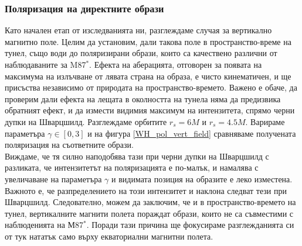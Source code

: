 \subsubsection{Поляризация на директните образи}
Като начален етап от изследванията ни, разглеждаме случая за вертикално магнитно поле. Целим да установим, дали такова поле в пространство-време на тунел, също води до поляризирани образи, които са качествено различни от наблюдаваните за M87$^*$. Ефекта на аберацията, отговорен за появата на максимума на излъчване от лявата страна на образа, е чисто кинематичен, и ще присъства независимо от природата на пространство-времето. Важено е обаче, да проверим дали ефекта на лещата в околността на тунела няма да предизвика обратният ефект, и да измести видимия максимум на интензитета, спрямо черни дупки на Шварцшилд. Разглеждаме орбитите $r_s = 6M$ и $r_s = 4.5M$. Варираме параметъра $\gamma\in[0,3]$ и на фигура \ref{WH_pol_vert_field} сравняваме получената поляризация на съответните образи.\\

Виждаме, че тя силно наподобява тази при черни дупки на Шварцшилд с разликата, че интензитетът на поляризацията е по-малък, и намалява с увеличаване на параметъра $\gamma$ и видимата позиция на образите е леко изместена. Важното е, че разпределението на този интензитет и наклона следват тези при Шварцшилд. Следователно, можем да заключим, че и в пространство-времето на тунел, вертикалните магнити полета пораждат образи, които не са съвместими с наблюденията на М87$^*$. Поради тази причина ще фокусираме разглежданията си от тук нататък само върху екваториални магнитни полета.


